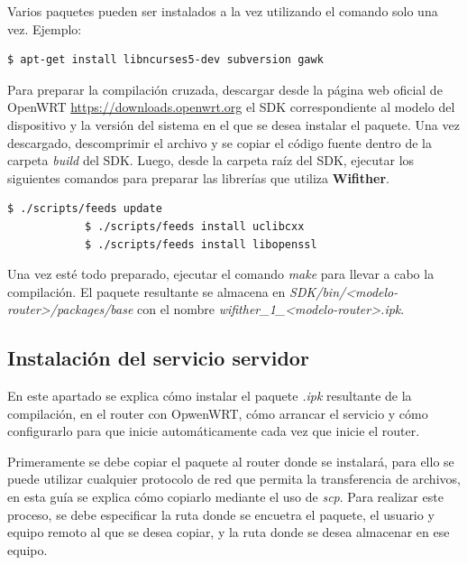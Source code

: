 \documentclass{article}
\begin{document}
        Varios paquetes pueden ser instalados a la vez utilizando el comando solo una vez.
        Ejemplo:

        \begin{lstlisting}[language=bash]
            $ apt-get install libncurses5-dev subversion gawk
        \end{lstlisting}

        Para preparar la compilación cruzada, descargar desde la página web oficial de OpenWRT \url{https://downloads.openwrt.org} el SDK correspondiente al modelo del dispositivo y la versión del sistema en el que se desea instalar el paquete. Una vez descargado, descomprimir el archivo y se copiar el código fuente dentro de la carpeta \textit{build} del SDK. Luego, desde la carpeta raíz del SDK, ejecutar los siguientes comandos para preparar las librerías que utiliza \textbf{Wifither}.

        \begin{lstlisting}[language=bash]
            $ ./scripts/feeds update
            $ ./scripts/feeds install uclibcxx
            $ ./scripts/feeds install libopenssl
        \end{lstlisting}

        Una vez esté todo preparado, ejecutar el comando \textit{make} para llevar a cabo la compilación. El paquete resultante se almacena en \textit{SDK/bin/<modelo-router>/packages/base} con el nombre \textit{wifither_1_<modelo-router>.ipk}.


    \subsection{Instalación del servicio servidor} 
        En este apartado se explica cómo instalar el paquete \textit{.ipk} resultante de la compilación, en el router con OpwenWRT, cómo arrancar  el servicio y cómo configurarlo para que inicie automáticamente cada vez que inicie el router.

        Primeramente se debe copiar el paquete al router donde se instalará, para ello se puede utilizar cualquier protocolo de red que permita la transferencia de archivos, en esta guía se explica cómo copiarlo mediante el uso de \textit{scp}. Para realizar este proceso, se debe especificar la ruta donde se encuetra el paquete, el usuario y equipo remoto al que se desea copiar, y la ruta donde se desea almacenar en ese equipo.
\end{document}
